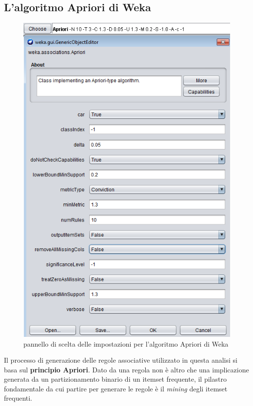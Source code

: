     \subsection{L'algoritmo Apriori di Weka}

    \begin{figure}
        \centering
        \caption{pannello di scelta delle impostazioni per l'algoritmo Apriori di Weka}
        \label{apriori_weka}
	    \includegraphics[scale=1.0]{img/apriori_weka.png}
    \end{figure}

        Il processo di generazione delle regole associative utilizzato in questa analisi si basa sul \textbf{principio Apriori}. Dato da una regola non è altro che una implicazione generata da un partizionamento binario di un itemset frequente, il pilastro fondamentale da cui partire per generare le regole è il \textit{mining} degli itemset frequenti. \\
        
